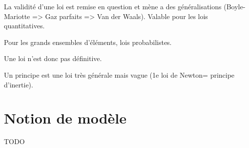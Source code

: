\documentclass{report}
\begin{document}
	La validité d'une loi est remise en question et mène a des généralisations (Boyle-Mariotte  => Gaz parfaits => Van der Waals). Valable pour les lois quantitatives.
	
	Pour les grands ensembles d'éléments, lois probabilistes.
	
	Une loi n'est donc pas définitive.
	
	Un principe est une loi très générale mais vague (1e loi de Newton= principe d'inertie).
	
	\section{Notion de modèle}
	TODO
	
	
\end{document}
